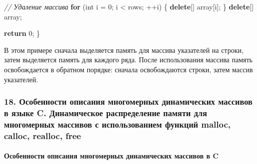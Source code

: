 \documentclass[
]{article}
\newenvironment{Shaded}{}{}
\newcommand{\CommentTok}[1]{\textcolor[rgb]{0.38,0.63,0.69}{\textit{#1}}}
\newcommand{\ControlFlowTok}[1]{\textcolor[rgb]{0.00,0.44,0.13}{\textbf{#1}}}
\newcommand{\DataTypeTok}[1]{\textcolor[rgb]{0.56,0.13,0.00}{#1}}
\newcommand{\DecValTok}[1]{\textcolor[rgb]{0.25,0.63,0.44}{#1}}
\newcommand{\KeywordTok}[1]{\textcolor[rgb]{0.00,0.44,0.13}{\textbf{#1}}}
\newcommand{\NormalTok}[1]{#1}
\newcommand{\OperatorTok}[1]{\textcolor[rgb]{0.40,0.40,0.40}{#1}}
\begin{document}
\begin{Shaded}
\begin{Highlighting}[]
    \CommentTok{// Удаление массива}
    \ControlFlowTok{for} \OperatorTok{(}\DataTypeTok{int}\NormalTok{ i }\OperatorTok{=} \DecValTok{0}\OperatorTok{;}\NormalTok{ i }\OperatorTok{\textless{}}\NormalTok{ rows}\OperatorTok{;} \OperatorTok{++}\NormalTok{i}\OperatorTok{)} \OperatorTok{\{}
        \KeywordTok{delete}\OperatorTok{[]}\NormalTok{ array}\OperatorTok{[}\NormalTok{i}\OperatorTok{];}
    \OperatorTok{\}}
    \KeywordTok{delete}\OperatorTok{[]}\NormalTok{ array}\OperatorTok{;}

    \ControlFlowTok{return} \DecValTok{0}\OperatorTok{;}
\OperatorTok{\}}
\end{Highlighting}
\end{Shaded}

В этом примере сначала выделяется память для массива указателей на
строки, затем выделяется память для каждого ряда. После использования
массива память освобождается в обратном порядке: сначала освобождаются
строки, затем массив указателей.

\subsubsection{18. Особенности описания многомерных динамических
массивов в языке C. Динамическое распределение памяти для многомерных
массивов с использованием функций malloc, calloc, realloc,
free}\label{ux43eux441ux43eux431ux435ux43dux43dux43eux441ux442ux438-ux43eux43fux438ux441ux430ux43dux438ux44f-ux43cux43dux43eux433ux43eux43cux435ux440ux43dux44bux445-ux434ux438ux43dux430ux43cux438ux447ux435ux441ux43aux438ux445-ux43cux430ux441ux441ux438ux432ux43eux432-ux432-ux44fux437ux44bux43aux435-c.-ux434ux438ux43dux430ux43cux438ux447ux435ux441ux43aux43eux435-ux440ux430ux441ux43fux440ux435ux434ux435ux43bux435ux43dux438ux435-ux43fux430ux43cux44fux442ux438-ux434ux43bux44f-ux43cux43dux43eux433ux43eux43cux435ux440ux43dux44bux445-ux43cux430ux441ux441ux438ux432ux43eux432-ux441-ux438ux441ux43fux43eux43bux44cux437ux43eux432ux430ux43dux438ux435ux43c-ux444ux443ux43dux43aux446ux438ux439-malloc-calloc-realloc-free}

\paragraph{Особенности описания многомерных динамических массивов в
C}\label{ux43eux441ux43eux431ux435ux43dux43dux43eux441ux442ux438-ux43eux43fux438ux441ux430ux43dux438ux44f-ux43cux43dux43eux433ux43eux43cux435ux440ux43dux44bux445-ux434ux438ux43dux430ux43cux438ux447ux435ux441ux43aux438ux445-ux43cux430ux441ux441ux438ux432ux43eux432-ux432-c-1}
\end{document}
